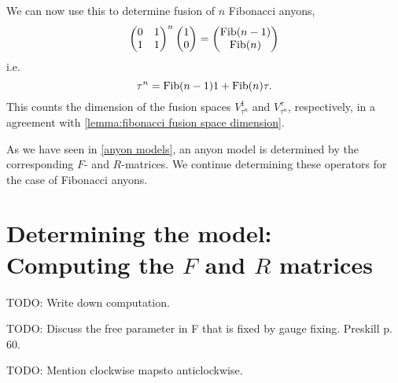 We can now use this to determine fusion of $n$ Fibonacci anyons,
\begin{equation}
  \begin{pmatrix}
    0 & 1 \\
    1 & 1
  \end{pmatrix}^n
  \begin{pmatrix}
    1 \\ 0
  \end{pmatrix} =
  \begin{pmatrix}
    \operatorname{Fib}(n-1) \\ \operatorname{Fib}(n)
  \end{pmatrix}
\end{equation}
i.e.\
\begin{equation}
  \tau^n = \operatorname{Fib}(n-1) 1 + \operatorname{Fib}(n) \tau.
\end{equation}
This counts the dimension of the fusion spaces $V_{\tau^n}^1$ and $V_{\tau^n}^\tau$, respectively, in a agreement with \cref{lemma:fibonacci fusion space dimension}.


As we have seen in \cref{anyon models}, an anyon model is determined by the corresponding $F$- and $R$-matrices. We continue determining these operators for the case of Fibonacci anyons.






\section{Determining the model: Computing the \texorpdfstring{$F$}{F} and \texorpdfstring{$R$}{R} matrices}

TODO: Write down computation.

TODO: Discuss the free parameter in F that is fixed by gauge fixing. Preskill p. 60.

TODO: Mention clockwise mapsto anticlockwise.


